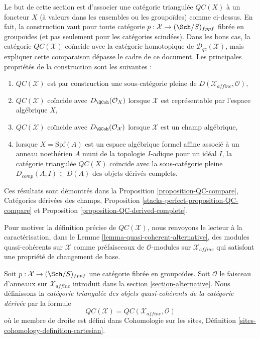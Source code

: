 \medskip\noindent
Le but de cette section est d'associer une catégorie triangulée
$\mathit{QC}(X)$ à un foncteur $X$ (à valeurs dans les ensembles ou les groupoïdes)
comme ci-dessus. En fait, la construction vaut pour toute catégorie
$p : \mathcal{X} \to (\Sch/S)_{fppf}$ fibrée en groupoïdes
(et pas seulement pour les catégories scindées). Dans les bons cas, la catégorie $\mathit{QC}(\mathcal{X})$
coïncide avec la catégorie homotopique de
$\mathcal{D}_{qc}(\mathcal{X})$,
mais expliquer cette comparaison dépasse le cadre de ce document.
Les principales propriétés de la construction sont les suivantes :
\begin{enumerate}
\item[(a)] $\mathit{QC}(\mathcal{X})$ est par construction une sous-catégorie pleine de
$D(\mathcal{X}_{affine}, \mathcal{O})$,
\item[(b)] $\mathit{QC}(\mathcal{X})$ coïncide avec $D_\QCoh(\mathcal{O}_X)$
lorsque $\mathcal{X}$ est représentable par l'espace algébrique $X$,
\item[(c)] $\mathit{QC}(\mathcal{X})$ coïncide avec
$D_\QCoh(\mathcal{O}_\mathcal{X})$ lorsque $\mathcal{X}$ est un champ algébrique,
\item[(d)] lorsque $X = \text{Spf}(A)$ est un espace algébrique formel affine
associé à un anneau noethérien $A$ muni de la topologie $I$-adique
pour un idéal $I$, la catégorie triangulée
$\mathit{QC}(X)$ coïncide avec la sous-catégorie pleine
$D_{comp}(A, I) \subset D(A)$ des objets dérivés complets.
\end{enumerate}
Ces résultats sont démontrés dans la
Proposition \ref{proposition-QC-compare},
Catégories dérivées des champs, Proposition
\ref{stacks-perfect-proposition-QC-compare} et
Proposition \ref{proposition-QC-derived-complete}.

\medskip\noindent
Pour motiver la définition précise de $\mathit{QC}(\mathcal{X})$,
nous renvoyons le lecteur à la caractérisation, dans le
Lemme \ref{lemma-quasi-coherent-alternative},
des modules quasi-cohérents sur $\mathcal{X}$ comme préfaisceaux de
$\mathcal{O}$-modules sur $\mathcal{X}_{affine}$ qui
satisfont une propriété de changement de base.

\begin{definition}
\label{definition-QC}
Soit $p : \mathcal{X} \to (\Sch/S)_{fppf}$ une catégorie fibrée en groupoïdes.
Soit $\mathcal{O}$ le faisceau d'anneaux sur $\mathcal{X}_{affine}$ introduit
dans la section \ref{section-alternative}. Nous définissons la
{\it catégorie triangulée des objets quasi-cohérents de la catégorie dérivée}
par la formule
$$
\mathit{QC}(\mathcal{X}) = \mathit{QC}(\mathcal{X}_{affine}, \mathcal{O})
$$
où le membre de droite est défini dans
Cohomologie sur les sites, Définition \ref{sites-cohomology-definition-cartesian}.
\end{definition}

